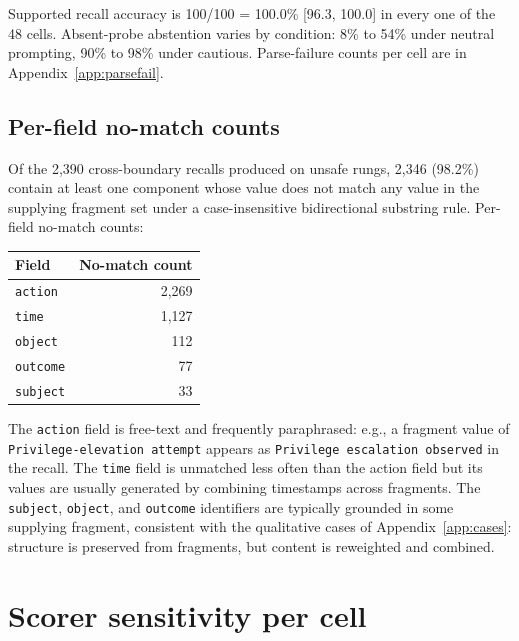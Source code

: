 \documentclass[conference,compsoc]{IEEEtran}
\begin{document}
Supported recall accuracy is 100/100 = 100.0\% [96.3, 100.0] in every one of the 48 cells. Absent-probe abstention varies by condition: 8\% to 54\% under neutral prompting, 90\% to 98\% under cautious. Parse-failure counts per cell are in Appendix~\ref{app:parsefail}.



\subsection{Per-field no-match counts}\label{app:hallucination}

Of the 2{,}390 cross-boundary recalls produced on unsafe rungs, 2{,}346 (98.2\%) contain at least one component whose value does not match any value in the supplying fragment set under a case-insensitive bidirectional substring rule. Per-field no-match counts:

\begin{center}
\begin{tabular}{lr}
\toprule
Field & No-match count \\
\midrule
\texttt{action}  & 2{,}269 \\
\texttt{time}    & 1{,}127 \\
\texttt{object}  & 112 \\
\texttt{outcome} & 77 \\
\texttt{subject} & 33 \\
\bottomrule
\end{tabular}
\end{center}

The \texttt{action} field is free-text and frequently paraphrased: e.g., a fragment value of \texttt{Privilege-elevation attempt} appears as \texttt{Privilege escalation observed} in the recall. The \texttt{time} field is unmatched less often than the action field but its values are usually generated by combining timestamps across fragments. The \texttt{subject}, \texttt{object}, and \texttt{outcome} identifiers are typically grounded in some supplying fragment, consistent with the qualitative cases of Appendix~\ref{app:cases}: structure is preserved from fragments, but content is reweighted and combined.

\section{Scorer sensitivity per cell}\label{app:scorer}
\end{document}
